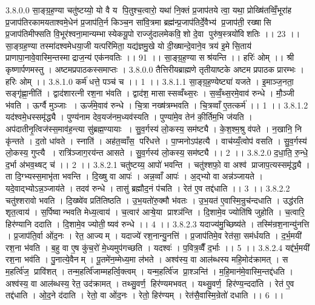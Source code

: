 3.8.0.0
सा॒ङ्ग्र॒ह॒ण्या चतु॑ष्टय्यो॒ यो वै य पि॒तुश्च॒त्वारो॒ यथा॑ नि॒क्तं प्र॒जाप॑तये त्वा॒ यथा॒ प्रोख्षि॑तव्विँ॒भूरा॑ह प्र॒जाप॑तिरकामयताश्वमे॒धेन॑ प्र॒जाप॑ति॒र्न किञ्च॒न सा॑वि॒त्रमा ब्रह्म॑न्प्र॒जाप॑तिर्दे॒वैभ्य॑ प्र॒जाप॑ती॒ रख्षा॑सि प्र॒जाप॑तिमीफ्सति वि॒भूर॑श्वना॒मान्यम्भा॑स्येकयू॒पो राज्जु॑दालमेकवि॒॒शो दे॒वा पुरु॑ष॒स्त्रयो॑विशतिः ।। 23 ।। सा॒ङ्ग्रह॒ण्या तस्मा॑दश्वमेधया॒जी यत्परि॑मिता॒ यद्य॑ज्ञमु॒खे यो दी॒ख्षान्दे॒वाने॒व त्रय॑ इ॒मे सि॒ताय॑ प्राणापा॒नावे॒वास्मि॒न्तस्माद्राज॒न्य॑ एक॑नवतिः ।। 91 ।। सा॒ङ्ग्र॒ह॒ण्या सश्र॑यन्ति ।। हरिः॑ ओम् ।। श्री कृष्णार्पणमस्तु । अष्टमप्रपाठकस्समाप्तः ।
3.8.0.0
तैत्तिरीयब्राह्मणे तृतीयाष्टके अष्टम प्रपाठक प्रारम्भः । हरिः ओम् ।।
3.8.1.0
कर्म॑ धत्ते॒ पञ्च॑ च ।। 1 ।।
3.8.1.1
सा॒ङ्ग्र॒ह॒ण्येष्ट्या॑ यजते । इ॒माञ्ज॒नता॒॒ सङ्गृ॑ह्णा॒नीति॑ । द्वाद॑शारत्नी रश॒ना भ॑वति । द्वाद॑श॒ मासास्सव्वँथ्स॒रः । स॒व्वँ॒थ्स॒रमे॒वाव॑ रुन्धे । मौ॒ञ्जी भ॑वति । ऊर्ग्वै मुञ्जाः । ऊर्ज॑मे॒वाव॑ रुन्धे । चि॒त्रा नख्ष॑त्रम्भवति । चि॒त्रव्वाँ ए॒तत्कर्म॑ ।। 1 ।।
3.8.1.2
यद॑श्वमे॒धस्समृ॑द्ध्यै । पुण्य॑नाम देव॒यज॑नम॒ध्यव॑स्यति । पुण्या॑मे॒व तेन॑ की॒र्तिम॒भि ज॑यति । अप॑दातीनृ॒त्विज॑स्स॒माव॑ह॒न्त्या सु॑ब्रह्म॒ण्यायाः । सु॒व॒र्गस्य॑ लो॒कस्य॒ सम॑ष्ट्यै । के॒श॒श्म॒श्रु व॑पते । न॒खानि॒ नि कृ॑न्तते । द॒तो धा॑वते । स्नाति॑ । अह॑त॒व्वाँस॒ परि॑धत्ते । पा॒प्मनोऽप॑हत्यै । वाच॑य्यँ॒त्वोप॑ वसति । सु॒व॒र्गस्य॑ लो॒कस्य॒ गुप्त्यै । रात्रि॑ञ्जाग॒रय॑न्त आसते । सु॒व॒र्गस्य॑ लो॒कस्य॒ सम॑ष्ट्यै ।। 2 ।।
3.8.2.0
द॒धा॒ति॒ रु॒न्धे॒ द॒र्भा अ॑भव॒थ्षट् च॑ ।। 2 ।।
3.8.2.1
चतु॑ष्टय्य॒ आपो॑ भवन्ति । चतु॑श्शफो॒ वा अश्व॑ प्राजाप॒त्यस्समृ॑द्ध्यै । ता दि॒ग्भ्यस्स॒माभृ॑ता भवन्ति । दि॒ख्षु वा आपः॑ । अन्न॒व्वाँ आपः॑ । अ॒द्भ्यो वा अन्न॑ञ्जायते । यदे॒वाद्भ्योऽन्न॒ञ्जाय॑ते । तदव॑ रुन्धे । तासु॑ ब्रह्मौद॒नं प॑चति । रेत॑ ए॒व तद्द॑धाति ।। 3 ।।
3.8.2.2
चतु॑श्शरावो भवति । दि॒ख्ष्वे॑व प्रति॑तिष्ठति । उ॒भ॒यतो॑रु॒क्मौ भ॑वतः । उ॒भ॒यत॑ ए॒वास्मि॒न्रुच॑न्दधाति । उद्ध॑रति शृत॒त्वाय॑ । स॒र्पिष्वान्भवति मेध्य॒त्वाय॑ । च॒त्वार॑ आऱ्षे॒या प्राश्ञ॑न्ति । दि॒शामे॒व ज्योति॑षि जुहोति । च॒त्वारि॒ हिर॑ण्यानि ददाति । दि॒शामे॒व ज्योती॒॒ष्यव॑ रुन्धे ।। 4 ।।
3.8.2.3
यदाज्य॑मु॒च्छिष्य॑ते । तस्मि॑न्रश॒नान्यु॑नत्ति । प्र॒जाप॑ति॒र्वा ओ॑द॒नः । रेत॒ आज्यम् । यदाज्ये॑ रश॒नान्यु॒नत्ति॑ । प्र॒जाप॑तिमे॒व रेत॑सा॒ सम॑र्धयति । द॒र्भ॒मयी॑ रश॒ना भ॑वति । ब॒हु वा ए॒ष कु॑च॒रो॑ मे॒ध्यमुप॑गच्छति । यदश्वः॑ । प॒वित्र॒व्वैँ द॒र्भाः ।। 5 ।।
3.8.2.4
यद्द॑र्भ॒मयी॑ रश॒ना भव॑ति । पु॒नात्ये॒वैनम् । पू॒तमे॑न॒म्मेध्य॒मा ल॑भते । अश्व॑स्य॒ वा आल॑ब्धस्य महि॒मोद॑क्रामत् । स म॒हर्त्वि॑ज॒ प्रावि॑शत् । तन्म॒हर्त्वि॑जाम्महर्त्वि॒क्त्वम् । यन्म॒हर्त्वि॑ज प्रा॒श्ञन्ति॑ । म॒हि॒मान॑मे॒वास्मि॒न्तद्द॑धति । अश्व॑स्य॒ वा आल॑ब्धस्य॒ रेत॒ उद॑क्रामत् । तथ्सु॒वर्ण॒॒ हिर॑ण्यमभवत् । यथ्सु॒वर्ण॒॒ हिर॑ण्य॒न्ददा॑ति । रेत॑ ए॒व तद्द॑धाति । ओ॒द॒ने द॑दाति । रेतो॒ वा ओ॑द॒नः । रेतो॒ हिर॑ण्यम् । रेत॑सै॒वास्मि॒न्रेतो॑ दधाति ।। 6 ।।
